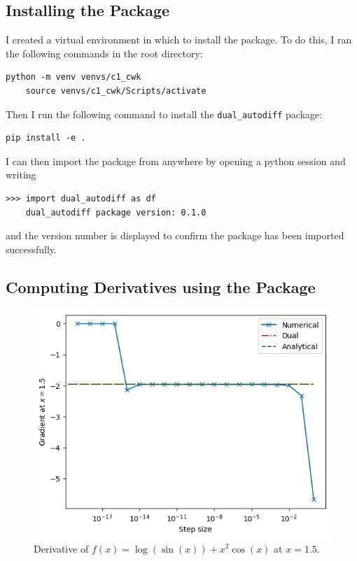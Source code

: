 \documentclass{article}
\begin{document}
\subsection{ Installing the Package }
I created a virtual environment in which to install the package. To do this, I ran the following commands in the root directory:
\begin{lstlisting}[style=mypythonstyle]
    python -m venv venvs/c1_cwk
    source venvs/c1_cwk/Scripts/activate
\end{lstlisting}
Then I run the following command to install the \texttt{dual\_autodiff} package:
\begin{lstlisting}[style=mypythonstyle]
    pip install -e .
\end{lstlisting}
I can then import the package from anywhere by opening a python session and writing
\begin{lstlisting}[style=mypythonstyle]
    >>> import dual_autodiff as df
    dual_autodiff package version: 0.1.0
\end{lstlisting}
and the version number is displayed to confirm the package has been imported successfully.

\subsection{ Computing Derivatives using the Package } \label{compderivs}

\begin{figure}[h!]
    \centering
    \includegraphics[width=0.7\linewidth]{q5_derivative.png}
    \caption{Derivative of \(f(x) = \log(\sin(x)) +x^2 \cos(x)\) at \(x=1.5\).}
    \label{fig:q5_derivative}
\end{figure}
\end{document}
